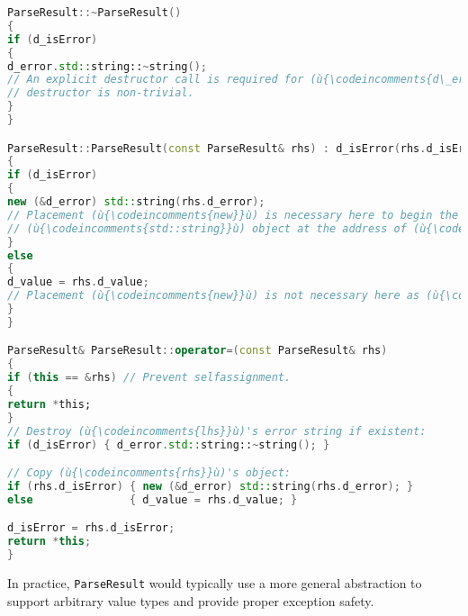 %
%
%
%
\begin{lstlisting}[language=C++]
ParseResult::~ParseResult()
{
if (d_isError)
{
d_error.std::string::~string();
// An explicit destructor call is required for (ù{\codeincomments{d\_error}}ù) because its
// destructor is non-trivial.
}
}

ParseResult::ParseResult(const ParseResult& rhs) : d_isError(rhs.d_isError)
{
if (d_isError)
{
new (&d_error) std::string(rhs.d_error);
// Placement (ù{\codeincomments{new}}ù) is necessary here to begin the lifetime of a
// (ù{\codeincomments{std::string}}ù) object at the address of (ù{\codeincomments{d\_error}}ù).
}
else
{
d_value = rhs.d_value;
// Placement (ù{\codeincomments{new}}ù) is not necessary here as (ù{\codeincomments{int}}ù) is a trivial type.
}
}

ParseResult& ParseResult::operator=(const ParseResult& rhs)
{
if (this == &rhs) // Prevent selfassignment.
{
return *this;
}
// Destroy (ù{\codeincomments{lhs}}ù)'s error string if existent:
if (d_isError) { d_error.std::string::~string(); }

// Copy (ù{\codeincomments{rhs}}ù)'s object:
if (rhs.d_isError) { new (&d_error) std::string(rhs.d_error); }
else               { d_value = rhs.d_value; }

d_isError = rhs.d_isError;
return *this;
}
\end{lstlisting}
In practice, \lstinline!ParseResult! would typically use a more general  abstraction to support arbitrary value types and provide proper exception safety.

